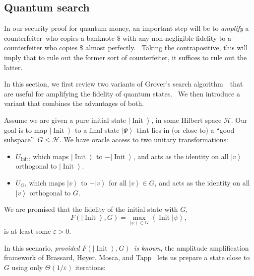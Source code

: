 \documentclass[10pt]{article}
\theoremstyle{definition}
\numberwithin{equation}{section}
\begin{document}
\subsection{Quantum search\label{SEARCH}}

In our security proof for quantum money, an important step will be to
\emph{amplify} a counterfeiter\ who copies a banknote $\$$ with any
non-negligible fidelity to a counterfeiter who copies $\$$ almost perfectly.
\ Taking the contrapositive, this will imply that to rule out the former sort
of counterfeiter, it suffices to rule out the latter.

In this section, we first review two variants of Grover's search algorithm~\cite{grover}\ that are useful for amplifying the fidelity of quantum states.
\ We then introduce a variant that combines the advantages of both.

Assume we are given a pure initial state $\left\vert \operatorname*{Init}%
\right\rangle $, in some Hilbert space $\mathcal{H}$. Our goal is to map
$\left\vert \operatorname*{Init}\right\rangle $ to a final state $\left\vert
\Psi\right\rangle $ that lies in (or close to) a \textquotedblleft good
subspace\textquotedblright\ $G\leq\mathcal{H}$. We have oracle access to two
unitary transformations:

\begin{itemize}
\item $U_{\operatorname*{Init}}$, which maps $\left\vert \operatorname*{Init}%
\right\rangle $ to $-\left\vert \operatorname*{Init}\right\rangle $, and acts
as the identity on all $\left\vert v\right\rangle $ orthogonal to $\left\vert
\operatorname*{Init}\right\rangle $.

\item $U_{G}$, which maps $\left\vert v\right\rangle $ to $-\left\vert
v\right\rangle $ for all $\left\vert v\right\rangle \in G$, and acts as the
identity on all $\left\vert v\right\rangle $ orthogonal to $G$.
\end{itemize}

We are promised that the fidelity of the initial state with $G$,%
\[
F\left(  \left\vert \operatorname*{Init}\right\rangle ,G\right)
=\max_{\left\vert \psi\right\rangle \in G}\left\langle \operatorname*{Init}%
|\psi\right\rangle ,
\]
is at least some $\varepsilon>0$.

In this scenario, \emph{provided }$F\left(  \left\vert \operatorname*{Init}%
\right\rangle ,G\right)  $\emph{\ is known}, the amplitude amplification
framework of Brassard, H\o yer, Mosca, and Tapp~\cite{bhmt} lets us prepare a
state close to $G$ using only $\Theta(1/\varepsilon)$ iterations:
\end{document}
